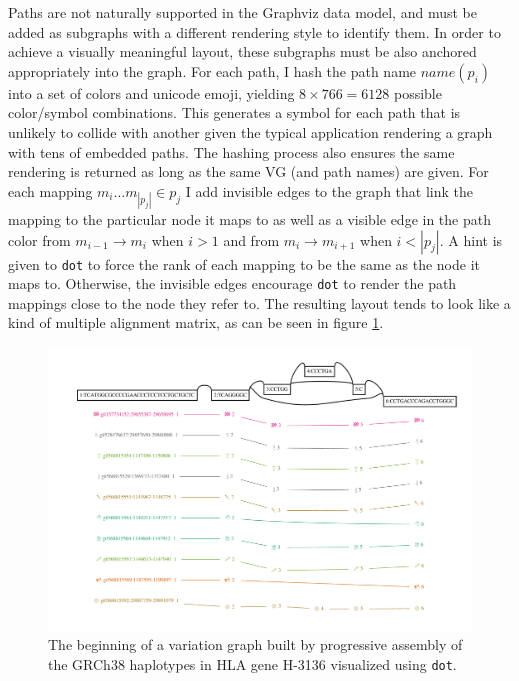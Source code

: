 Paths are not naturally supported in the Graphviz data model, and must be added as subgraphs with a different rendering style to identify them.
In order to achieve a visually meaningful layout, these subgraphs must be also anchored appropriately into the graph.
For each path, I hash the path name $name(p_i)$ into a set of colors and unicode emoji, yielding $8 \times 766 = 6128$ possible color/symbol combinations.
This generates a symbol for each path that is unlikely to collide with another given the typical application rendering a graph with tens of embedded paths.
The hashing process also ensures the same rendering is returned as long as the same VG (and path names) are given.
For each mapping $m_i\ldots m_{|p_j|} \in p_j$ I add invisible edges to the graph that link the mapping to the particular node it maps to as well as a visible edge in the path color from $m_{i-1} \to m_i$ when $i > 1$ and from $m_i \to m_{i+1}$ when $i < |p_j|$.
A hint is given to {\tt dot} to force the rank of each mapping to be the same as the node it maps to.
Otherwise, the invisible edges encourage {\tt dot} to render the path mappings close to the node they refer to.
The resulting layout tends to look like a kind of multiple alignment matrix, as can be seen in figure \ref{fig:vg_view_dot}.

\begin{figure}[htbp!] 
\centering    
\includegraphics[width=1.0\textwidth]{Chapter2/Figs/Vector/vg_view_dp_H-3136_dot.pdf}
\caption[Hierarchical visualization with Graphviz's {\tt dot}]{The beginning of a variation graph built by progressive assembly of the GRCh38 haplotypes in HLA gene H-3136 visualized using {\tt dot}.}
\label{fig:vg_view_dot}
\end{figure}

